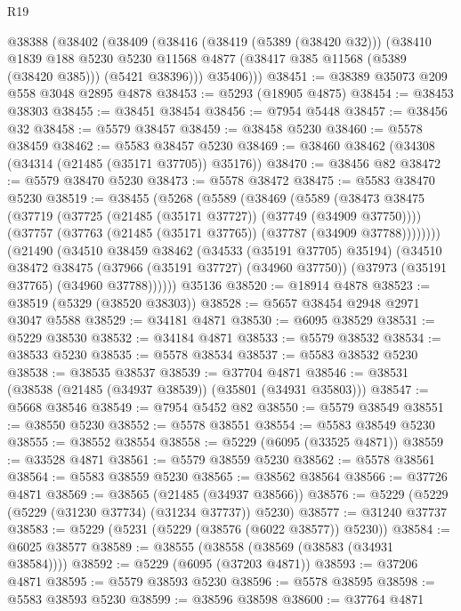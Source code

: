 \begin{lexlean}{R19}
\begin{coremodule}
    @38388
      (@38402
        (@38409
          (@38416
            (@38419 (@5389 (@38420 @32)))
            (@38410
              @1839
              @188
              @5230
              @5230
              @11568
              @4877
              (@38417 @385 @11568 (@5389 (@38420 @385)))
              (@5421 @38396)))
          @35406)))
@38451 := @38389 @35073 @209 @558 @3048 @2895 @4878
@38453 := @5293 (@18905 @4875)
@38454 := @38453 @38303
@38455 := @38451 @38454
@38456 := @7954 @5448
@38457 := @38456 @32
@38458 := @5579 @38457
@38459 := @38458 @5230
@38460 := @5578 @38459
@38462 := @5583 @38457 @5230
@38469 := @38460 @38462 (@34308 (@34314 (@21485 (@35171 @37705)) @35176))
@38470 := @38456 @82
@38472 := @5579 @38470 @5230
@38473 := @5578 @38472
@38475 := @5583 @38470 @5230
@38519 := @38455
    (@5268
      (@5589
        (@38469
          (@5589
            (@38473
              @38475
              (@37719 (@37725 (@21485 (@35171 @37727)) (@37749 (@34909 @37750))))
              (@37757 (@37763 (@21485 (@35171 @37765)) (@37787 (@34909 @37788))))))))
      (@21490
        (@34510
          @38459
          @38462
          (@34533 (@35191 @37705) @35194)
          (@34510
            @38472
            @38475
            (@37966 (@35191 @37727) (@34960 @37750))
            (@37973 (@35191 @37765) (@34960 @37788))))))
    @35136
@38520 := @18914 @4878
@38523 := @38519 (@5329 (@38520 @38303))
@38528 := @5657 @38454 @2948 @2971 @3047 @5588
@38529 := @34181 @4871
@38530 := @6095 @38529
@38531 := @5229 @38530
@38532 := @34184 @4871
@38533 := @5579 @38532
@38534 := @38533 @5230
@38535 := @5578 @38534
@38537 := @5583 @38532 @5230
@38538 := @38535 @38537
@38539 := @37704 @4871
@38546 := @38531 (@38538 (@21485 (@34937 @38539)) (@35801 (@34931 @35803)))
@38547 := @5668 @38546
@38549 := @7954 @5452 @82
@38550 := @5579 @38549
@38551 := @38550 @5230
@38552 := @5578 @38551
@38554 := @5583 @38549 @5230
@38555 := @38552 @38554
@38558 := @5229 (@6095 (@33525 @4871))
@38559 := @33528 @4871
@38561 := @5579 @38559 @5230
@38562 := @5578 @38561
@38564 := @5583 @38559 @5230
@38565 := @38562 @38564
@38566 := @37726 @4871
@38569 := @38565 (@21485 (@34937 @38566))
@38576 := @5229 (@5229 (@5229 (@31230 @37734) (@31234 @37737)) @5230)
@38577 := @31240 @37737
@38583 := @5229 (@5231 (@5229 (@38576 (@6022 @38577)) @5230))
@38584 := @6025 @38577
@38589 := @38555 (@38558 (@38569 (@38583 (@34931 @38584))))
@38592 := @5229 (@6095 (@37203 @4871))
@38593 := @37206 @4871
@38595 := @5579 @38593 @5230
@38596 := @5578 @38595
@38598 := @5583 @38593 @5230
@38599 := @38596 @38598
@38600 := @37764 @4871

\end{coremodule}
\end{lexlean}
